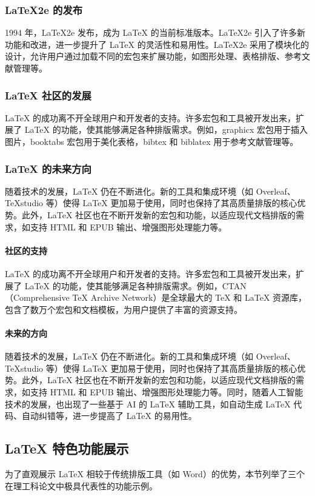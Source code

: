 \documentclass[UTF8,AutoFakeBold=1,AutoFakeSlant,zihao=-4]{SCAU}
\begin{document}
\subsubsection{LaTeX2e 的发布}
1994 年，LaTeX2e 发布，成为 LaTeX 的当前标准版本。LaTeX2e 引入了许多新功能和改进，进一步提升了 LaTeX 的灵活性和易用性。LaTeX2e 采用了模块化的设计，允许用户通过加载不同的宏包来扩展功能，如图形处理、表格排版、参考文献管理等。

\subsubsection{LaTeX 社区的发展}
LaTeX 的成功离不开全球用户和开发者的支持。许多宏包和工具被开发出来，扩展了 LaTeX 的功能，使其能够满足各种排版需求。例如，graphicx 宏包用于插入图片，booktabs 宏包用于美化表格，bibtex 和 biblatex 用于参考文献管理等。

\subsubsection{LaTeX 的未来方向}
随着技术的发展，LaTeX 仍在不断进化。新的工具和集成环境（如 Overleaf、TeXstudio 等）使得 LaTeX 更加易于使用，同时也保持了其高质量排版的核心优势。此外，LaTeX 社区也在不断开发新的宏包和功能，以适应现代文档排版的需求，如支持 HTML 和 EPUB 输出、增强图形处理能力等。

\paragraph{社区的支持}
LaTeX 的成功离不开全球用户和开发者的支持。许多宏包和工具被开发出来，扩展了 LaTeX 的功能，使其能够满足各种排版需求。例如，CTAN（Comprehensive TeX Archive Network）是全球最大的 TeX 和 LaTeX 资源库，包含了数万个宏包和文档模板，为用户提供了丰富的资源支持。

\paragraph{未来的方向}
随着技术的发展，LaTeX 仍在不断进化。新的工具和集成环境（如 Overleaf、TeXstudio 等）使得 LaTeX 更加易于使用，同时也保持了其高质量排版的核心优势。此外，LaTeX 社区也在不断开发新的宏包和功能，以适应现代文档排版的需求，如支持 HTML 和 EPUB 输出、增强图形处理能力等。同时，随着人工智能技术的发展，也出现了一些基于 AI 的 LaTeX 辅助工具，如自动生成 LaTeX 代码、自动纠错等，进一步提高了 LaTeX 的易用性。

\subsection{LaTeX 特色功能展示}
为了直观展示 LaTeX 相较于传统排版工具（如 Word）的优势，本节列举了三个在理工科论文中极具代表性的功能示例。
\end{document}
